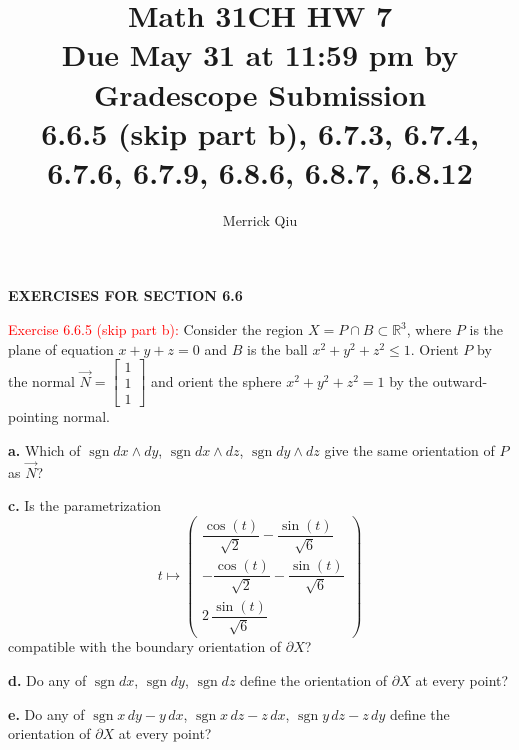 \documentclass[12pt]{article}
\title{Math 31CH HW 7\\ Due May 31 at 11:59 pm by Gradescope Submission\\
6.6.5 (skip part b), 6.7.3, 6.7.4, 6.7.6, 6.7.9,  6.8.6, 6.8.7, 6.8.12}
\author{Merrick Qiu}
\date{}
\newcommand{\RR}{\mathbb{R}}
\begin{document}
\maketitle


\begin{center}
   \textbf{EXERCISES FOR SECTION 6.6}
\end{center}



\textcolor{red}{Exercise 6.6.5 (skip part b):}
Consider the region $X=P \cap B \subset \RR^3$,
where $P$ is the plane of equation $x+y+z=0$ and $B$ is the ball $x^2 +y^2 +z^2 \leq 1$.
Orient $P$ by the normal
$\vec N = \begin{bmatrix}1\\1\\1\end{bmatrix}$
and orient the sphere $x^2 +y^2 +z^2 = 1$ by the
outward-pointing normal.

\textbf{a.} Which of $\operatorname{sgn} dx\wedge dy$,
$\operatorname{sgn} dx\wedge dz$,
$\operatorname{sgn} dy\wedge dz$
give the same orientation of $P$ as $\vec N $?

\textbf{c.} Is the parametrization
\begin{equation*}
    t \mapsto \begin{pmatrix}
    \dfrac{\cos (t)}{\sqrt{2}} - \dfrac{\sin (t)}{\sqrt{6}} \\
    -  \dfrac{\cos (t)}{\sqrt{2}} - \dfrac{\sin (t)}{\sqrt{6}} \\
    2\, \dfrac{\sin (t)}{\sqrt{6}}
    \end{pmatrix}
\end{equation*}
compatible with the boundary orientation of $\partial X$?

\textbf{d.} Do any of $\operatorname{sgn} dx$,
$\operatorname{sgn} dy$,
$\operatorname{sgn} dz$
define the orientation of $\partial X$ at every point?

\textbf{e.} Do any of $\operatorname{sgn} x \,dy - y\,dx$,
$\operatorname{sgn} x\,dz - z\, dx$,
$\operatorname{sgn} y \,dz - z \, dy$
define the orientation of $\partial X$ at every point?
\medskip
\end{document}
